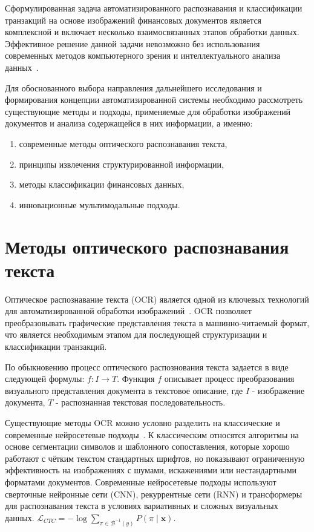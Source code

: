 \documentclass[14pt,a4paper]{extarticle}
\let\oldsection\section
\renewcommand{\section}{\clearpage\oldsection}
\begin{document}
Сформулированная задача автоматизированного распознавания и классификации транзакций на основе изображений финансовых документов является комплексной и включает несколько взаимосвязанных этапов обработки данных. Эффективное решение данной задачи невозможно без использования современных методов компьютерного зрения и интеллектуального анализа данных~\cite{panteleeva2025}.

Для обоснованного выбора направления дальнейшего исследования и формирования концепции автоматизированной системы необходимо рассмотреть существующие методы и подходы, применяемые для обработки изображений документов и анализа содержащейся в них информации, а именно:

\begin{enumerate} 
\item современные методы оптического распознавания текста,
\item принципы извлечения структурированной информации,
\item методы классификации финансовых данных,
\item инновационные мультимодальные подходы.
\end{enumerate}

\section{Методы оптического распознавания текста}

Оптическое распознавание текста (OCR) является одной из ключевых технологий для автоматизированной обработки изображений~\cite{vorozhtsova2019}. OCR позволяет преобразовывать графические представления текста в машинно-читаемый формат, что является необходимым этапом для последующей структуризации и классификации транзакций.

По обыкновению процесс оптического распознования текста задается в виде следующей формулы: $f : I \rightarrow T$. Функция $f$ описывает процесс преобразования визуального представления документа в текстовое описание, где $I$ - изображение документа, $T$ - распознанная текстовая последовательность.

Существующие методы OCR можно условно разделить на классические и современные нейросетевые подходы~\cite{davletov2023}. К классическим относятся алгоритмы на основе сегментации символов и шаблонного сопоставления, которые хорошо работают с чётким текстом стандартных шрифтов, но показывают ограниченную эффективность на изображениях с шумами, искажениями или нестандартными форматами документов. Современные нейросетевые подходы используют сверточные нейронные сети (CNN), рекуррентные сети (RNN) и трансформеры для распознавания текста в условиях вариативных и сложных визуальных данных. $\mathcal{L}_{CTC} = - \log \sum_{\pi \in \mathcal{B}^{-1}(y)} P(\pi \mid \mathbf{x})$.
\end{document}
